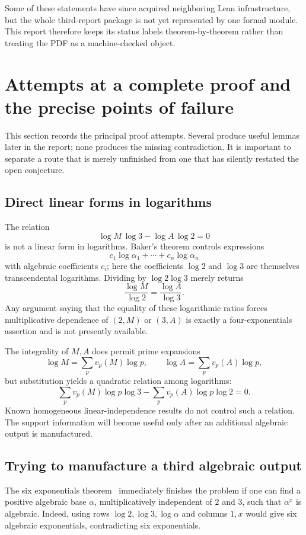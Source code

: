 \documentclass[11pt,oneside]{article}
\theoremstyle{definition}
\theoremstyle{remark}
\newcommand{\vpp}[2]{v_{#1}\!\left(#2\right)}
\begin{document}
Some of these statements have since acquired neighboring Lean infrastructure, but the whole
third-report package is not yet represented by one formal module.  This report therefore
keeps its status labels theorem-by-theorem rather than treating the PDF as a machine-checked
object.

\section{Attempts at a complete proof and the precise points of failure}

This section records the principal proof attempts.  Several produce useful lemmas later in
the report; none produces the missing contradiction.  It is important to separate a route
that is merely unfinished from one that has silently restated the open conjecture.

\subsection{Direct linear forms in logarithms}

The relation
\[
  \log M\,\log3-\log A\,\log2=0
\]
is not a linear form in logarithms.  Baker's theorem controls expressions
\[
  c_1\log\alpha_1+\cdots+c_n\log\alpha_n
\]
with algebraic coefficients $c_i$; here the coefficients $\log 2$ and $\log 3$ are themselves
transcendental logarithms.  Dividing by $\log2\log3$ merely returns
\[
  \frac{\log M}{\log2}=\frac{\log A}{\log3}.
\]
Any argument saying that the equality of these logarithmic ratios forces multiplicative
dependence of $(2,M)$ or $(3,A)$ is exactly a four-exponentials assertion and is not presently
available.

The integrality of $M,A$ does permit prime expansions
\[
 \log M=\sum_p \vpp pM\log p,
 \qquad
 \log A=\sum_p \vpp pA\log p,
\]
but substitution yields a quadratic relation among logarithms:
\[
 \sum_p \vpp pM\log p\log3
 -\sum_p \vpp pA\log p\log2=0.
\]
Known homogeneous linear-independence results do not control such a relation.  The support
information will become useful only after an additional algebraic output is manufactured.

\subsection{Trying to manufacture a third algebraic output}

The six exponentials theorem~\cite{Ramachandra1968,Lang1966,Waldschmidt2000} immediately finishes the problem if one can find a positive
algebraic base $\alpha$, multiplicatively independent of $2$ and $3$, such that $\alpha^x$ is
algebraic.  Indeed, using rows $\log2,\log3,\log\alpha$ and columns $1,x$ would give six
algebraic exponentials, contradicting six exponentials.
\end{document}
